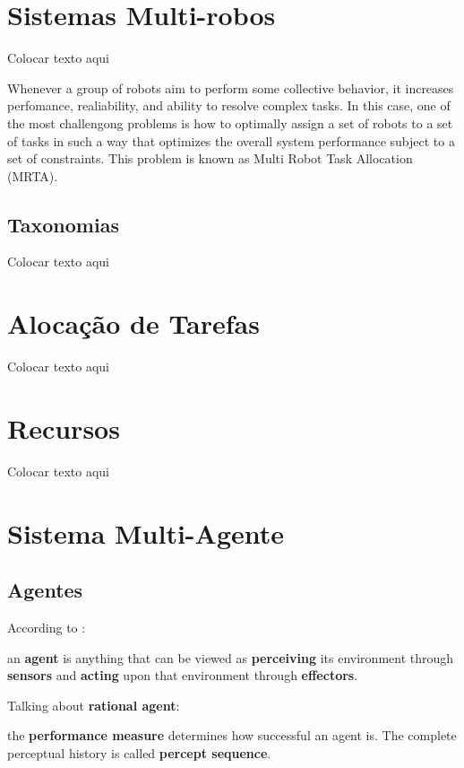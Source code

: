 \section{Sistemas Multi-robos} \label{sec:sec1_2}
Colocar texto aqui

Whenever a group of robots aim to perform some collective behavior, it increases perfomance, realiability, and ability to resolve complex tasks. In this case, one of the most challengong problems is how to optimally assign a set of robots to a set of tasks in such a way that optimizes the overall system performance subject to a set of constraints. This problem is known as Multi Robot Task Allocation (MRTA).

\subsection{Taxonomias} \label{sub:sub1_2_1}
Colocar texto aqui

\section{Alocação de Tarefas} \label{sec:sec1_3}
Colocar texto aqui

\section{Recursos} \label{sec:sec1_4}
Colocar texto aqui







\section{Sistema Multi-Agente}

\subsection{Agentes}

According to \cite{ref:russell1995aima}:

an \textbf{agent} is anything that can be viewed as \textbf{perceiving} its environment through \textbf{sensors} and \textbf{acting} upon that environment through \textbf{effectors}.

Talking about \textbf{rational agent}:

the \textbf{performance measure} determines how successful an agent is. The complete perceptual history is called \textbf{percept sequence}.

